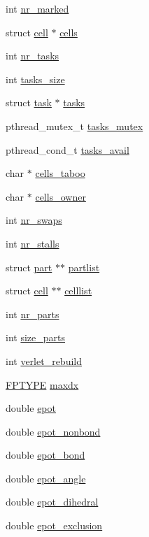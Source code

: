 \begin{DoxyCompactItemize}
int \hyperlink{structspace_abb0eaf746daf1a24f0844a5312bc108a}{nr\-\_\-marked}
\item 
struct \hyperlink{structcell}{cell} $\ast$ \hyperlink{structspace_a5fcdf8d2c127017ce4b6e64090d1cd73}{cells}
\item 
int \hyperlink{structspace_a02f48908e70244064a7b68a055b9ae2c}{nr\-\_\-tasks}
\item 
int \hyperlink{structspace_a51ba14384309b40c30d6a908b8caab5d}{tasks\-\_\-size}
\item 
struct \hyperlink{structtask}{task} $\ast$ \hyperlink{structspace_ace3a87c7e253bce95072d59dfcb2622f}{tasks}
\item 
pthread\-\_\-mutex\-\_\-t \hyperlink{structspace_a733e78f89bc6e3cd82d2248ae5c38992}{tasks\-\_\-mutex}
\item 
pthread\-\_\-cond\-\_\-t \hyperlink{structspace_aed87af14b8cd94b2bbc6ce0e3f6b489f}{tasks\-\_\-avail}
\item 
char $\ast$ \hyperlink{structspace_af860b180149142663caba8550e2405cb}{cells\-\_\-taboo}
\item 
char $\ast$ \hyperlink{structspace_a5d59d4f2d4e53bd50dfc8464b74f1964}{cells\-\_\-owner}
\item 
int \hyperlink{structspace_a5152553ed5afee9e5396a8263b0e3600}{nr\-\_\-swaps}
\item 
int \hyperlink{structspace_a2dbcd77d069cc25923e3c909b0c2d978}{nr\-\_\-stalls}
\item 
struct \hyperlink{structpart}{part} $\ast$$\ast$ \hyperlink{structspace_acbc3d878bac5d0776f53e8f208d143f6}{partlist}
\item 
struct \hyperlink{structcell}{cell} $\ast$$\ast$ \hyperlink{structspace_a32ca6cb42b7d1a9053d50077fba94fe0}{celllist}
\item 
int \hyperlink{structspace_ac4dd7e5fa976280ea5c88ef8206c2d5b}{nr\-\_\-parts}
\item 
int \hyperlink{structspace_a40717ee7b6746d1305b707e53b83665e}{size\-\_\-parts}
\item 
int \hyperlink{structspace_a767fceff621253e5a779078970a5973b}{verlet\-\_\-rebuild}
\item 
\hyperlink{fptype_8h_a78f09a67f3e652a3b25e085a0082a835}{F\-P\-T\-Y\-P\-E} \hyperlink{structspace_af95a2d78a1e550c6602480b8afb4d9ff}{maxdx}
\item 
double \hyperlink{structspace_a3e050eccabbd5322482d7f63e45f038d}{epot}
\item 
double \hyperlink{structspace_a6ed20d960a8500fd893f49042778b87d}{epot\-\_\-nonbond}
\item 
double \hyperlink{structspace_a7f960eb873757cb71ba74f9575dfcc3d}{epot\-\_\-bond}
\item 
double \hyperlink{structspace_a13161f6f83303cc16b2f447181f82e59}{epot\-\_\-angle}
\item 
double \hyperlink{structspace_aab31fcdff2c60c9ccdda04ce05779152}{epot\-\_\-dihedral}
\item 
double \hyperlink{structspace_a97dac668d1649b9ce547e6831444de48}{epot\-\_\-exclusion}
\end{DoxyCompactItemize}


